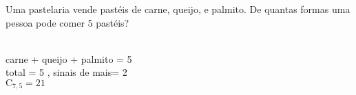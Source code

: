 \begin{ex}
 Uma pastelaria vende pastéis de carne, queijo, e palmito. De quantas formas uma pessoa pode comer 5 pastéis?
   \begin{sol}
     \phantom{A} \\
     carne + queijo + palmito = 5\\
     total = 5 , sinais de mais= 2 \\
     $\mathrm{C}_{7,5} = 21$
   \end{sol}
\end{ex}